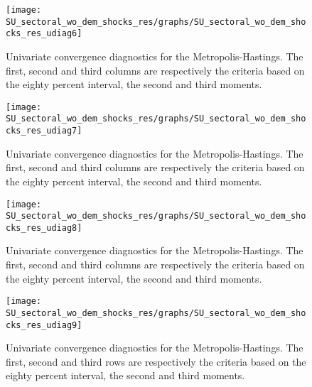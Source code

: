 \begin{figure}[H]
\centering 
\texttt{[image: SU\_sectoral\_wo\_dem\_shocks\_res/graphs/SU\_sectoral\_wo\_dem\_shocks\_res\_udiag6]}
\caption{Univariate convergence diagnostics for the Metropolis-Hastings.
The first, second and third columns are respectively the criteria based on
the eighty percent interval, the second and third moments.}\label{Fig:UnivariateDiagnostics:6}
\end{figure}

\begin{figure}[H]
\centering 
\texttt{[image: SU\_sectoral\_wo\_dem\_shocks\_res/graphs/SU\_sectoral\_wo\_dem\_shocks\_res\_udiag7]}
\caption{Univariate convergence diagnostics for the Metropolis-Hastings.
The first, second and third columns are respectively the criteria based on
the eighty percent interval, the second and third moments.}\label{Fig:UnivariateDiagnostics:7}
\end{figure}

\begin{figure}[H]
\centering 
\texttt{[image: SU\_sectoral\_wo\_dem\_shocks\_res/graphs/SU\_sectoral\_wo\_dem\_shocks\_res\_udiag8]}
\caption{Univariate convergence diagnostics for the Metropolis-Hastings.
The first, second and third columns are respectively the criteria based on
the eighty percent interval, the second and third moments.}\label{Fig:UnivariateDiagnostics:8}
\end{figure}

\begin{figure}[H]
\centering 
\texttt{[image: SU\_sectoral\_wo\_dem\_shocks\_res/graphs/SU\_sectoral\_wo\_dem\_shocks\_res\_udiag9]}
\caption{Univariate convergence diagnostics for the Metropolis-Hastings.
The first, second and third rows are respectively the criteria based on
the eighty percent interval, the second and third moments.}\label{Fig:UnivariateDiagnostics:9}
\end{figure}

